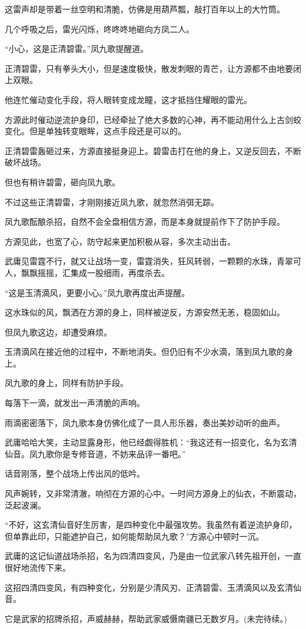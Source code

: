\begin{this_body}
这雷声却是带着一丝空明和清脆，仿佛是用葫芦瓢，敲打百年以上的大竹筒。

几个呼吸之后，雷光闪烁，咚咚咚地砸向方凤二人。

“小心，这是正清碧雷。”凤九歌提醒道。

正清碧雷，只有拳头大小，但是速度极快，散发刺眼的青芒，让方源都不由地要闭上双眼。

他连忙催动变化手段，将人眼转变成龙瞳，这才抵挡住耀眼的雷光。

方源此时催动逆流护身印，已经牵扯了绝大多数的心神，再不能动用什么上古剑蛟变化。但是单独转变眼眸，这点手段还是可以的。

正清碧雷轰砸过来，方源直接挺身迎上。碧雷击打在他的身上，又逆反回去，不断破坏战场。

但也有稍许碧雷，砸向凤九歌。

不过这些正清碧雷，才刚刚接近凤九歌，就忽然消弭无踪。

凤九歌酝酿杀招，自然不会全盘相信方源，而是本身就提前作下了防护手段。

方源见此，也宽了心，防守起来更加积极从容，多次主动出击。

武庸见雷霆不行，就又让战场一变，雷霆消失，狂风转弱，一颗颗的水珠，青翠可人，飘飘摇摇，汇集成一股细雨，再度杀去。

“这是玉清滴风，更要小心。”凤九歌再度出声提醒。

这水珠似的风，飘洒在方源的身上，同样被逆反，方源安然无恙，稳固如山。

但凤九歌这边，却遭受麻烦。

玉清滴风在接近他的过程中，不断地消失。但仍旧有不少水滴，落到凤九歌的身上。

凤九歌的身上，同样有防护手段。

每落下一滴，就发出一声清脆的声响。

雨滴密密落下，凤九歌本身仿佛化成了一具人形乐器，奏出美妙动听的曲声。

武庸哈哈大笑，主动显露身形，他已经觑得胜机：“我这还有一招变化，名为玄清仙音。凤九歌你是专修音道，不妨来品评一番吧。”

话音刚落，整个战场上传出风的低吟。

风声婉转，又非常清澈，响彻在方源的心中。一时间方源身上的仙衣，不断震动，泛起波澜。

“不好，这玄清仙音好生厉害，是四种变化中最强攻势。我虽然有着逆流护身印，但单靠此印，只能遮护自己，如何能帮助凤九歌？”方源心中顿时一沉。

武庸的这记仙道战场杀招，名为四清四变风，乃是由一位武家八转先祖开创，一直很好地流传下来。

这招四清四变风，有四种变化，分别是少清风刃、正清碧雷、玉清滴风以及玄清仙音。

它是武家的招牌杀招，声威赫赫，帮助武家威慑南疆已无数岁月。(未完待续。)

\end{this_body}

